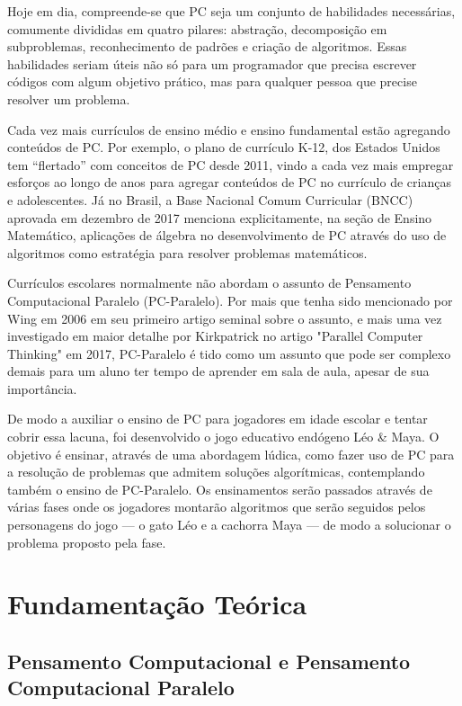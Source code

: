 \documentclass[conference]{IEEEtran}
\begin{document}
Hoje em dia, compreende-se que PC seja um conjunto de habilidades necessárias, comumente divididas em quatro pilares: abstração, decomposição em subproblemas, reconhecimento de padrões e criação de algoritmos\cite{brackmann_desenvolvimento_2017}. Essas habilidades seriam úteis não só para um programador que precisa escrever códigos com algum objetivo prático, mas para qualquer pessoa que precise resolver um problema.

Cada vez mais currículos de ensino médio e ensino fundamental estão agregando conteúdos de PC. Por exemplo, o plano de currículo K-12, dos Estados Unidos tem ``flertado'' com conceitos de PC desde 2011\cite{barr_bringing_2011}, vindo a cada vez mais empregar esforços ao longo de anos para agregar conteúdos de PC no currículo de crianças e adolescentes. Já no Brasil, a Base Nacional Comum Curricular (BNCC) aprovada em dezembro de 2017 menciona explicitamente, na seção de Ensino Matemático, aplicações de álgebra no desenvolvimento de PC através do uso de algoritmos como estratégia para resolver problemas matemáticos\cite{ministerio_da_educacao_base_2018}.

Currículos escolares normalmente não abordam o assunto de Pensamento Computacional Paralelo (PC-Paralelo). Por mais que tenha sido mencionado por Wing em 2006 em seu primeiro artigo seminal sobre o assunto, e mais uma vez investigado em maior detalhe por Kirkpatrick no artigo "Parallel Computer Thinking" em 2017, PC-Paralelo é tido como um assunto que pode ser complexo demais para um aluno ter tempo de aprender em sala de aula, apesar de sua importância\cite{kirkpatrick_parallel_2017}.

De modo a auxiliar o ensino de PC para jogadores em idade escolar e tentar cobrir essa lacuna,  foi desenvolvido o jogo educativo endógeno Léo \& Maya.  O objetivo é ensinar, através de uma abordagem lúdica, como fazer uso de PC para a resolução de problemas que admitem soluções algorítmicas, contemplando também o ensino de PC-Paralelo. Os ensinamentos serão passados através de várias fases onde os jogadores montarão algoritmos que serão seguidos pelos personagens do jogo — o gato Léo e a cachorra Maya — de modo a solucionar o problema proposto pela fase.

\section{Fundamentação Teórica}

\subsection{Pensamento Computacional e Pensamento Computacional Paralelo}
\end{document}
